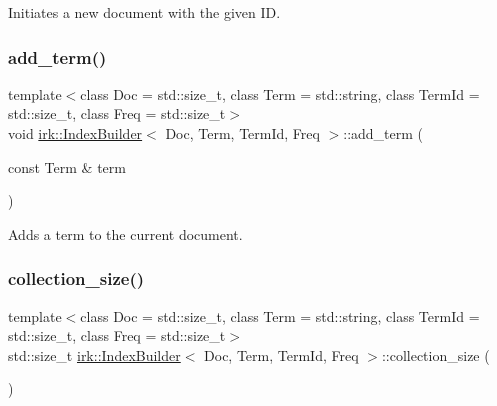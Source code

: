 Initiates a new document with the given ID. 

\mbox{\label{classirk_1_1IndexBuilder_a93a3d32fc32223bb67350886bb5d8b88}} 
\subsubsection{\texorpdfstring{add\+\_\+term()}{add\_term()}}
{\footnotesize\ttfamily template$<$class Doc  = std\+::size\+\_\+t, class Term  = std\+::string, class Term\+Id  = std\+::size\+\_\+t, class Freq  = std\+::size\+\_\+t$>$ \\
void \mbox{\hyperlink{classirk_1_1IndexBuilder}{irk\+::\+Index\+Builder}}$<$ Doc, Term, Term\+Id, Freq $>$\+::add\+\_\+term (\begin{DoxyParamCaption}\item[{const Term \&}]{term }\end{DoxyParamCaption})\hspace{0.3cm}{\ttfamily [inline]}}



Adds a term to the current document. 

\mbox{\label{classirk_1_1IndexBuilder_ab46c693a0651c12897db799ab1bc31f0}} 
\subsubsection{\texorpdfstring{collection\+\_\+size()}{collection\_size()}}
{\footnotesize\ttfamily template$<$class Doc  = std\+::size\+\_\+t, class Term  = std\+::string, class Term\+Id  = std\+::size\+\_\+t, class Freq  = std\+::size\+\_\+t$>$ \\
std\+::size\+\_\+t \mbox{\hyperlink{classirk_1_1IndexBuilder}{irk\+::\+Index\+Builder}}$<$ Doc, Term, Term\+Id, Freq $>$\+::collection\+\_\+size (\begin{DoxyParamCaption}{ }\end{DoxyParamCaption})\hspace{0.3cm}{\ttfamily [inline]}}



